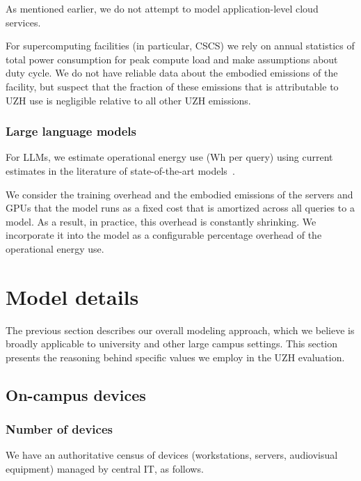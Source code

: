 \documentclass[11pt]{article}
\begin{document}
As mentioned earlier, we do not attempt to model application-level cloud services.

For supercomputing facilities (in particular, CSCS) we rely on annual statistics of total power consumption for peak compute load and make assumptions about duty cycle. We do not have reliable data about the embodied emissions of the facility, but suspect that the fraction of these emissions that is attributable to UZH use is negligible relative to all other UZH emissions.

\subsubsection*{Large language models}

For LLMs, we estimate operational energy use (Wh per query) using current estimates in the literature of state-of-the-art models~\cite{devries2023growing,epoch2025howmuchenergydoeschatgptuse}.

We consider the training overhead and the embodied emissions of the servers and GPUs that the model runs as a fixed cost that is amortized across all queries to a model. As a result, in practice, this overhead is constantly shrinking. We incorporate it into the model as a configurable percentage overhead of the operational energy use.

\section{Model details}
\label{sec:model:details}

The previous section describes our overall modeling approach, which we believe is broadly applicable to university and other large campus settings. This section presents the reasoning behind specific values we employ in the UZH evaluation.

\subsection{On-campus devices}

\subsubsection*{Number of devices}

We have an authoritative census of devices (workstations, servers, audiovisual equipment) managed by central IT, as follows.
\end{document}

